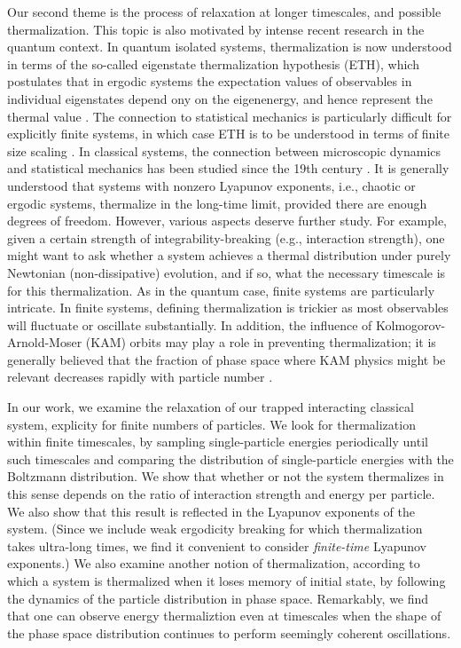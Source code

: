 \documentclass[a4paper, onecolumn]{revtex4-1}
\begin{document}
Our second theme is the process of relaxation at longer timescales, and possible thermalization.
This topic is also motivated by intense recent research in the quantum context.  In quantum isolated
systems, thermalization is now understood in terms of the so-called eigenstate thermalization
hypothesis (ETH), which postulates that in ergodic systems the expectation values of observables in
individual eigenstates depend ony on the eigenenergy, and hence represent the thermal value
\cite{PolkovnikovRigol_AdvPhys2016, BorgonoviIzrailevSantos_PhysRep2016,
  ETH_Deutsch_Srednicki_Rigol}.  The connection to statistical mechanics is particularly difficult
for explicitly finite systems, in which case ETH is to be understood in terms of finite size scaling
\cite{ETHscaling}.  In classical systems, the connection between microscopic dynamics and
statistical mechanics has been studied since the 19th century \cite{Gaspard_book_1998,
  Dorfman_book_1999, Dumas_book_KAMstory, Boltzmann_legacy_book, EckmannRuelle_RMP85,
  Gaspard_PhysicaA06}.  It is generally understood that systems with nonzero Lyapunov exponents,
i.e., chaotic or ergodic systems, thermalize in the long-time limit, provided there are enough
degrees of freedom.  
%
However, various aspects deserve further study.  For example, given a certain strength of
integrability-breaking (e.g., interaction strength), one might want to ask whether a system achieves
a thermal distribution under purely Newtonian (non-dissipative) evolution, and if so, what the
necessary timescale is for this thermalization.
%
As in the quantum case, finite systems are particularly intricate.  In finite systems, defining
thermalization is trickier as most observables will fluctuate or oscillate substantially.  In
addition, the influence of Kolmogorov-Arnold-Moser (KAM) orbits may play a role in preventing
thermalization; it is generally believed that the fraction of phase space where KAM physics might be
relevant decreases rapidly with particle number \cite{Dumas_book_KAMstory}.

In our work, we examine the relaxation of our trapped interacting classical system, explicity for
finite numbers of particles.  We look for thermalization within finite timescales, by sampling
single-particle energies periodically until such timescales and comparing the distribution of
single-particle energies with the Boltzmann distribution.  We show that whether or not the system
thermalizes in this sense depends on the ratio of interaction strength and energy per particle.  We
also show that this result is reflected in the Lyapunov exponents of the system.  (Since we include
weak ergodicity breaking for which thermalization takes ultra-long times, we find it convenient to
consider \emph{finite-time} Lyapunov exponents.)
%
We also examine another notion of thermalization, according to which a system is thermalized when it
loses memory of initial state, by following the dynamics of the particle distribution in phase
space.  Remarkably, we find that one can observe energy thermaliztion even at timescales when the
shape of the phase space distribution continues to perform seemingly coherent oscillations.
\end{document}
